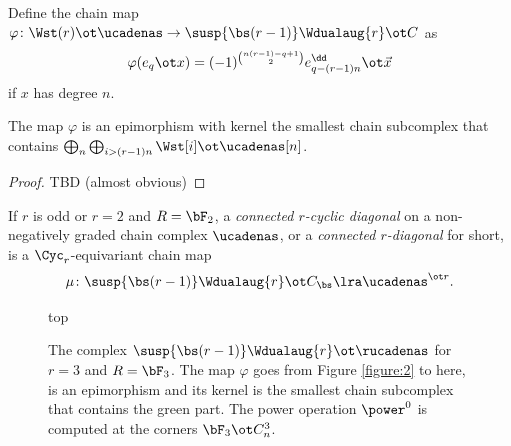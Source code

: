 Define the chain map $\varphi \colon \Wst(r)\ot \ucadenas \to \susp{\bs(r-1)}\Wdualaug{r} \ot C$ as 
\[
\varphi(e_q \ot x) = (-1)^{\binom{n(r-1)-q+1}{2}}e_{q-(r-1)n}^\dd \ot \vec{x}
\]
if $x$ has degree $n$.
\begin{lemma} The map $\varphi$ is an epimorphism with kernel the smallest chain subcomplex that contains $\bigoplus_n\bigoplus_{i>(r-1)n} \Wst[i] \ot \ucadenas[n]$.
\end{lemma}
\begin{proof} TBD (almost obvious)
\end{proof}

\begin{definition}\label{def:connected_diagonal}
If $r$ is odd or $r=2$ and $R=\bF_2$, a \emph{connected $r$-cyclic diagonal} on a non-negatively graded chain complex $\ucadenas$, or a \textit{connected $r$-diagonal} for short, is a $\Cyc_r$-equivariant chain map
	\[
	\mu \colon \susp{\bs(r-1)}\Wdualaug{r} \ot C_{\bs} \lra \ucadenas^{\ot r}.
	\]
\end{definition}

\begin{figure}{top}
	
	\caption{If a stable diagonal for $r=3$ vanishes on the part coloured in green, then $\power^i$ vanishes for $i<0$.}
	\label{figure:2}
	
	\vspace{2cm}
	
	\caption{The complex $\susp{\bs(r-1)}\Wdualaug{r} \ot \rucadenas$ for $r=3$ and $R=\bF_3$. The map $\varphi$ goes from Figure \ref{figure:2} to here, is an epimorphism and its kernel is the smallest chain subcomplex that contains the green part. The power operation $\power^0$ is computed at the corners $\bF_3\ot C^3_n$.} 
	\label{figure:3}
\end{figure}




